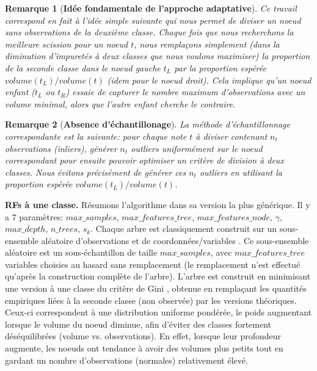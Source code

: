\documentclass[a4paper, 12pt]{article}
\newtheorem{remarque}{Remarque}
\begin{document}
\begin{remarque}[\textbf{Idée fondamentale de l'approche adaptative}]
Ce travail correspond en fait à l'idée simple suivante qui nous permet de diviser un noeud sans observations de la deuxième classe.
Chaque fois que nous recherchons la meilleure scission pour un noeud $t$, nous remplaçons simplement (dans la diminution d'impuretés à deux classes que nous voulons maximiser) la proportion de la seconde classe dans le noeud gauche $t_L$ par la proportion espérée $volume(t_L)/volume(t)$ (idem pour le noeud droit).
Cela implique qu'un noeud enfant ($t_L$ ou $t_R$) essaie de capturer le nombre maximum d'observations avec un volume minimal, alors que l'autre enfant cherche le contraire.
\end{remarque}


\begin{remarque}[\textbf{Absence d'échantillonage}]
La méthode d'échantillonnage correspondante est la suivante: pour chaque note $t$ à diviser contenant $n_t$ observations (inliers), générer $n_t$ outliers uniformément sur le noeud  correspondant pour ensuite pouvoir optimiser un critère de division à deux classes. Nous \emph {évitons précisément de générer} ces $n_t$ outliers en utilisant la proportion espérée $volume(t_L) / volume(t)$.
\end{remarque}



\textbf{RFs à une classe.} Résumons l'algorithme dans sa version la plus générique.
Il y a $7$ paramètres:
%
$max\_samples$, $max\_features\_tree$, $max\_features\_node$, $\gamma$, $max\_depth$, $n\_trees$, $s_k$.
%
Chaque arbre est classiquement construit sur un sous-ensemble aléatoire d'observations et de coordonnées/variables  \citep{Ho1998, Panov2007}.
Ce sous-ensemble aléatoire est un sous-échantillon de taille $max\_samples$, avec $max\_features\_tree$ variables choisies au hasard sans remplacement (le remplacement n'est effectué qu'après la construction complète de l'arbre). L'arbre est construit en minimisant une version à une classe du critère de Gini \citep{Gini1912}, obtenue en remplaçant les quantités empiriques liées à la seconde classe (non observée) par les versions théoriques. Ceux-ci correspondent à une distribution uniforme pondérée, le poids augmentant lorsque le volume du noeud diminue, afin d'éviter des classes fortement déséquilibrées (volume vs. observations). En effet, lorsque leur profondeur augmente, les noeuds ont tendance à avoir des volumes plus petits tout en gardant un nombre d'observations (normales) relativement élevé.
\end{document}
